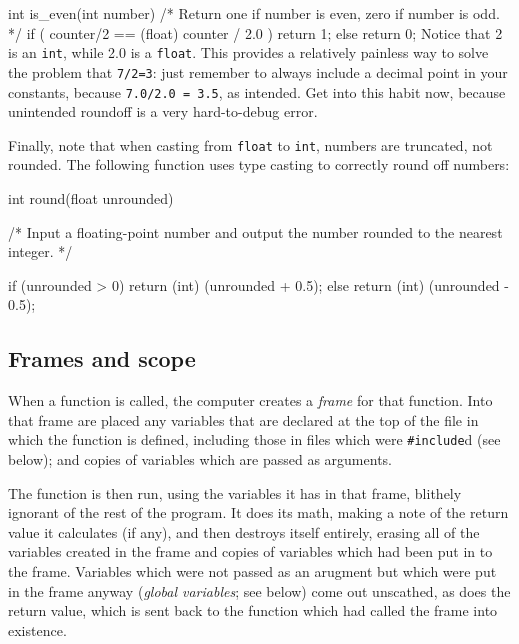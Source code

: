 \documentclass[12pt]{article}
\begin{document}
int is_even(int number){
/* Return one if number is even, zero if number is odd.  */
   if ( counter/2 == (float) counter / 2.0 )
        return 1;
   else 
        return 0;
}
Notice that 2 is an {\tt int}, while 2.0 is a {\tt float}. This provides
a relatively painless way to solve the problem that {\tt 7/2=3}: just
remember to always include a decimal point in your constants, because
{\tt 7.0/2.0 = 3.5}, as intended. Get into this habit now,
because unintended roundoff is a very hard-to-debug error.

Finally, note that when casting from {\tt float} to {\tt int}, numbers
are truncated, not rounded.  The following function uses type casting
to correctly round off numbers:

int round(float unrounded){
/* Input a floating-point number and output the number
   rounded to the nearest integer.  */

    if (unrounded > 0)
         return (int) (unrounded + 0.5);
    else
         return (int) (unrounded - 0.5);
}



\subsection{Frames and scope}  
When a function is called, the computer creates a
{\sl frame} for that function. Into that frame are placed any variables
that are declared at the top of the file in which the function is defined,
including those in files which were {\tt \#include}d (see below); and copies of
variables which are passed as arguments. 

The function is then run, using the variables it has in that frame,
blithely ignorant of the rest of the program. It does its math, making a
note of the return value it calculates (if any), and then destroys itself
entirely, erasing all of the variables created in the frame and copies
of variables which had been put in to the frame. Variables which were not
passed as an arugment but which were put in the frame anyway ({\sl global
variables}; see below) come out unscathed, as does the return value, which
is sent back to the function which had called the frame into existence.
\end{document}
